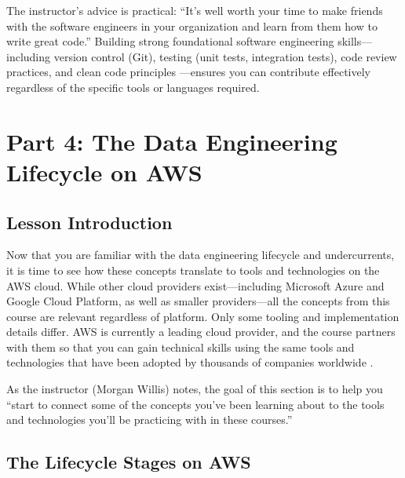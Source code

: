 \documentclass{article}
\begin{document}
The instructor's advice is practical: ``It's well worth your time to make friends with the software engineers in your organization and learn from them how to write great code.'' Building strong foundational software engineering skills---including version control (Git), testing (unit tests, integration tests), code review practices, and clean code principles \cite{martin2008clean}---ensures you can contribute effectively regardless of the specific tools or languages required.

\newpage

\section{Part 4: The Data Engineering Lifecycle on AWS}

\subsection{Lesson Introduction}
Now that you are familiar with the data engineering lifecycle and undercurrents, it is time to see how these concepts translate to tools and technologies on the AWS cloud. While other cloud providers exist---including Microsoft Azure and Google Cloud Platform, as well as smaller providers---all the concepts from this course are relevant regardless of platform. Only some tooling and implementation details differ. AWS is currently a leading cloud provider, and the course partners with them so that you can gain technical skills using the same tools and technologies that have been adopted by thousands of companies worldwide \cite{aws2023overview}.

As the instructor (Morgan Willis) notes, the goal of this section is to help you ``start to connect some of the concepts you've been learning about to the tools and technologies you'll be practicing with in these courses.''

\subsection{The Lifecycle Stages on AWS}
\end{document}
